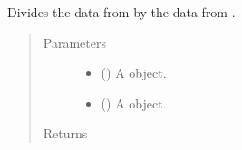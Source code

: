 \documentclass[letterpaper,10pt,openany,oneside,english]{sphinxmanual}
\begin{document}
\begin{fulllineitems}
\label{\detokenize{additional_functions:fredpy.divide}}
Divides the data from  by the data from .
\begin{quote}\begin{description}
\item[{Parameters}] \leavevmode\begin{itemize}
\item {} 
 ({\hyperref[\detokenize{series_class:fredpy.series}]{}}) \textendash{} A {\hyperref[\detokenize{series_class:fredpy.series}]{}} object.

\item {} 
 ({\hyperref[\detokenize{series_class:fredpy.series}]{}}) \textendash{} A {\hyperref[\detokenize{series_class:fredpy.series}]{}} object.

\end{itemize}

\item[{Returns}] \leavevmode
{\hyperref[\detokenize{series_class:fredpy.series}]{}}

\end{description}\end{quote}

\end{fulllineitems}

\end{document}
